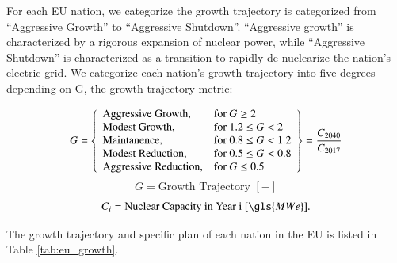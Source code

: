 For each \gls{EU} nation, we categorize the growth trajectory is categorized from
``Aggressive Growth'' to ``Aggressive Shutdown''. ``Aggressive growth'' is
characterized by a rigorous expansion of nuclear power, while
``Aggressive Shutdown'' is characterized as a transition to rapidly
de-nuclearize the nation's electric grid. We categorize each nation's growth 
trajectory into five degrees depending on G, the growth trajectory metric:

 \[
 G = \left\{\begin{array}{ll}
 \text{Aggressive Growth}, & \text{for } G \geq 2\\
 \text{Modest Growth}, & \text{for } 1.2 \leq G < 2\\
 \text{Maintanence}, & \text{for } 0.8 \leq G < 1.2 \\
 \text{Modest Reduction}, & \text{for } 0.5 \leq G< 0.8\\
 \text{Aggressive Reduction}, & \text{for } G \leq 0.5
 \end{array}\right\} = \frac{C_{2040}}{C_{2017}}\\\\
 \]
 \[
  G = \text{Growth Trajectory  } [-] 
 \]
 \[
 C_{i} = \text{Nuclear Capacity in Year i  } [\gls{MWe}].
 \]

The growth trajectory and specific plan of each nation in the \gls{EU} 
is listed in Table \ref{tab:eu_growth}.  

